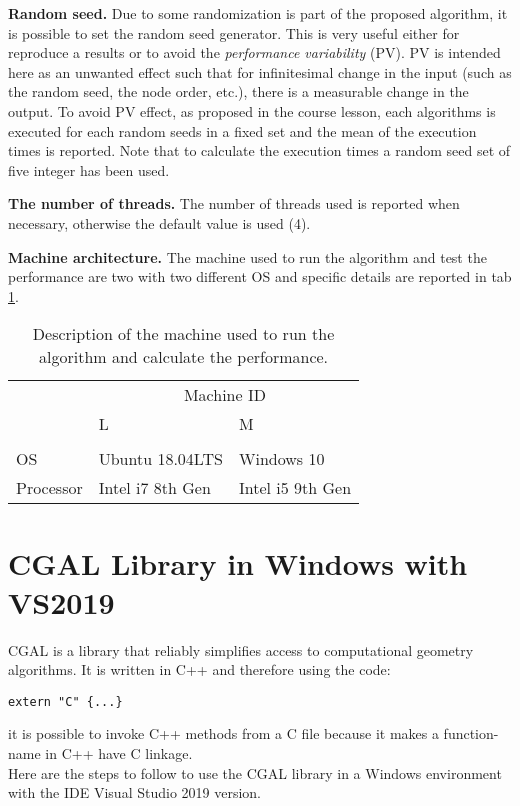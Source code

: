 \documentclass[11pt, english, openany]{report}
\begin{document}
\begin{appendices}
			\textbf{Random seed.} Due to some randomization is part of the proposed algorithm, it is possible to set the random seed generator. This is very useful either for reproduce a results or to avoid the \textit{performance variability} (PV). PV is intended here as an unwanted effect such that for infinitesimal change in the input (such as the random seed, the node order, etc.), there is a measurable change in the output. To avoid PV effect, as proposed in the course lesson, each algorithms is executed for each random seeds in a fixed set and the mean of the execution times is reported. Note that to calculate the execution times a random seed set of five integer has been used.
			
			\textbf{The number of threads.} The number of threads used is reported when necessary, otherwise the default value is used (4).
			
			\textbf{Machine architecture.} The machine used to run the algorithm and test the performance are two with two different OS and specific details are reported in tab \ref{tab:machines}.
			\begin{table}[h]
				\begin{center}
					\caption{Description of the machine used to run the algorithm and calculate the performance.}
					\label{tab:machines}
					\begin{tabular}{lll}
									&   \multicolumn{2}{c}{Machine ID} 	\\
						 			& L 				&	 M 			\\ \hline \\
						OS 			& Ubuntu 18.04LTS 	& Windows 10 	\\
						Processor	& Intel i7 8th Gen	&	Intel i5 9th Gen		\\
					\end{tabular}
				\end{center}
			\end{table}

		\chapter{CGAL Library in Windows with VS2019} \label{sec:cagalOne}
CGAL is a library that reliably simplifies access to computational geometry algorithms. It is written in C++ and therefore using the code:
\begin{lstlisting}
extern "C" {...}
\end{lstlisting}

it is possible to invoke C++ methods from a C file because it makes a function-name in C++ have C linkage. \\
Here are the steps to follow to use the CGAL library in a Windows environment with the IDE Visual Studio 2019 version.\\


\end{appendices}
\end{document}
